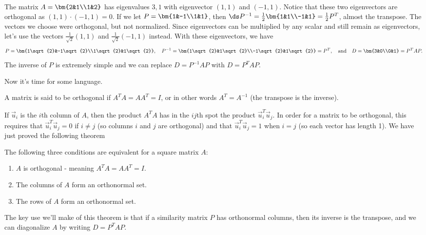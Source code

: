 \begin{example}
The matrix $A = \bm {2&1\\1&2}$ has eigenvalues $3,1$ with eigenvector $(1,1)$ and $(-1,1)$. 
Notice that these two eigenvectors are orthogonal as $(1,1)\cdot(-1,1)=0$. 
If we let $P = \bm{1&-1\\1&1}$, then $\ds P^{-1} = \frac{1}{2}\bm{1&1\\-1&1} = \frac{1}{2}P^T$, almost the transpose.
The vectors we choose were orthogonal, but not normalized. Since eigenvectors can be multiplied by any scalar and still remain as eigenvectors, let's use the vectors $\frac{1}{\sqrt{2}}(1,1)$ and $\frac{1}{\sqrt{2}}(-1,1)$ instead. With these eigenvectors, we have 
$$P = \bm{1\sqrt{2}&-1\sqrt{2}\\1\sqrt{2}&1\sqrt{2}}, \quad P^{-1} = \bm{1\sqrt{2}&1\sqrt{2}\\-1\sqrt{2}&1\sqrt{2}} = P^T,\quad
\text{and}\quad D = \bm{3&0\\0&1} = P^T A P.$$ 
The inverse of $P$ is extremely simple and we can replace $D=P^{-1}AP$ with $D=P^T A P$.  
\end{example}

Now it's time for some language.
\begin{definition}
A matrix is said to be orthogonal if $A^TA=AA^T=I$, or in other words $A^T=A^{-1}$ (the transpose is the inverse).  
\end{definition}
 If $\vec u_i$ is the $i$th column of $A$, then the product $A^TA$ has in  the $ij$th spot the product $\vec u_i^T \vec u_j$.  In order for a matrix to be orthogonal, this requires that $\vec u_i^T \vec u_j=0$ if $i\neq j$ (so columns $i$ and $j$ are orthogonal) and that $\vec u_i^T \vec u_j=1$ when $i=j$ (so each vector has length 1).  We have just proved the following theorem
\begin{theorem}
The following three conditions are equivalent for a square matrix $A$:
\begin{enumerate}
	\item $A$ is orthogonal - meaning $A^TA=AA^T=I$.
	\item The columns of $A$ form an orthonormal set.
	\item The rows of $A$ form an orthonormal set.
\end{enumerate}
\end{theorem}
The key use we'll make of this theorem is that if a similarity matrix $P$ has orthonormal columns, then its inverse is the transpose, and we can diagonalize $A$ by writing $D=P^TAP$. 


